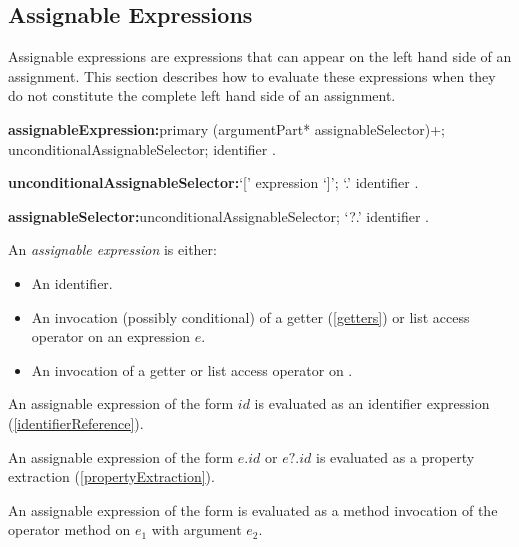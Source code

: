 \documentclass{article}
\begin{document}
\subsection{Assignable Expressions}

\LMHash{}
Assignable expressions are expressions that can appear on the left hand side of an assignment.
This section describes how to evaluate these expressions when they do not constitute the complete left hand side of an assignment.


\begin{grammar}
{\bf assignableExpression:}primary (argumentPart* assignableSelector)+;
  \SUPER{} unconditionalAssignableSelector;
  identifier
  .

{\bf unconditionalAssignableSelector:}`[' expression `]';
  `{\escapegrammar .}' identifier
  .

{\bf assignableSelector:}unconditionalAssignableSelector;
  `{\escapegrammar ?.}' identifier
  .
\end{grammar}

\LMHash{}
An {\em assignable expression} is either:
\begin{itemize}
\item An identifier.
\item An invocation (possibly conditional) of a getter (\ref{getters}) or list access operator on an expression $e$.
\item An invocation of a getter or list access operator on \SUPER{}.
\end{itemize}

\LMHash{}
An assignable expression of the form $id$ is evaluated as an identifier expression (\ref{identifierReference}).


\LMHash{}
An assignable expression of the form $e.id$ or $e?.id$ is evaluated as a property extraction (\ref{propertyExtraction}).

\LMHash{}
An assignable expression of the form  is evaluated as a method invocation of the operator method \code{[]} on $e_1$ with argument $e_2$.
\end{document}
